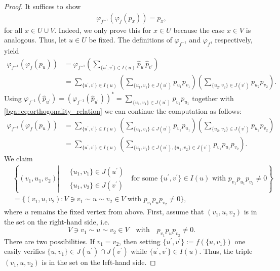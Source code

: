 \documentclass[a4paper]{amsart}
\begin{document}
\begin{proof}
    It suffices to show 
    \begin{align*}
        \varphi_{f^{-1}}(\varphi_f(p_x)) = p_x,
    \end{align*}
    for all $x \in U \cup V$. Indeed, we only prove this for $x \in U$ because the case $x \in V$ is analogous. Thus, let $u \in U$ be fixed.
    The definitions of $\varphi_{f^{-1}}$ and $\varphi_f$, respectively, yield 
    \begin{align*}
        \varphi_{f^{-1}}(\varphi_f(p_u))
            &= \varphi_{f^{-1}}\left( \sum_{\{u^\prime, v^\prime\} \in I(u)} \hat{p}_{u^\prime} \hat{p}_{v^\prime} \right) \\
            &= \sum_{\{u^\prime, v^\prime\} \in I(u)} \left( \sum_{\{u_1, v_1\} \in J(u^\prime)} p_{u_1} p_{v_1} \right) \left( \sum_{\{u_2, v_2\} \in J(v^\prime)} p_{u_2} p_{v_2} \right).
    \end{align*}
    Using $\varphi_{f^{-1}}(\hat{p}_{u^\prime}) = \left(\varphi_{f^{-1}}(\hat{p}_{u^\prime})\right)^\ast = \sum_{\{u_1, v_1\} \in J(u^\prime)} p_{v_1} p_{u_1}$ together with \eqref{bga::eq:orthogonality_relation} we can continue the computation as follows:
    \begin{align*}
        \varphi_{f^{-1}}(\varphi_f(p_u))
            &= \sum_{\{u^\prime, v^\prime\} \in I(u)} \left( \sum_{\{u_1, v_1\} \in J(u^\prime)}  p_{v_1} p_{u_1}\right) \left( \sum_{\{u_2, v_2\} \in J(v^\prime)} p_{u_2} p_{v_2} \right) \\
            &= \sum_{\{u^\prime, v^\prime\} \in I(u)} \left( \sum_{\{u_1, v_1\} \in J(u^\prime), \{u_1, v_2\} \in J(v^\prime)} p_{v_1} p_{u_1} p_{v_2} \right).
    \end{align*}
    We claim
    \begin{align*} 
        &\left\{(v_1, u_1, v_2) \left| \;
            \begin{aligned}
                &\{u_1, v_1\} \in J(u^\prime) \\
                &\{u_1, v_2\} \in J(v^\prime)
            \end{aligned} \;
                \text{ for some } \{u^\prime, v^\prime\} \in I(u)
                \text{ with } p_{v_1} p_{u_1} p_{v_2} \neq 0 
            \right. \right\} \\
        &=\{(v_1, u, v_2): V \ni v_1 \sim u \sim v_2 \in V \text{ with } p_{v_1} p_u p_{v_2} \neq 0 \},
    \end{align*}
    where $u$ remains the fixed vertex from above.
    First, assume that $(v_1, u, v_2)$ is in the set on the right-hand side, i.e. 
    $$ V \ni v_1 \sim u \sim v_2 \in V \quad \text{with} \quad p_{v_1} p_u p_{v_2} \neq 0. $$ 
    There are two possibilities. If $v_1 = v_2$, then setting $\{u^\prime, v^\prime\} := f(\{u, v_1\})$ one easily verifies $\{u, v_1\} \in J(u^\prime) \cap J(v^\prime)$ while $\{u^\prime, v^\prime\} \in I(u)$. Thus, the triple $(v_1, u, v_2)$ is in the set on the left-hand side.
    

\end{proof}
\end{document}
